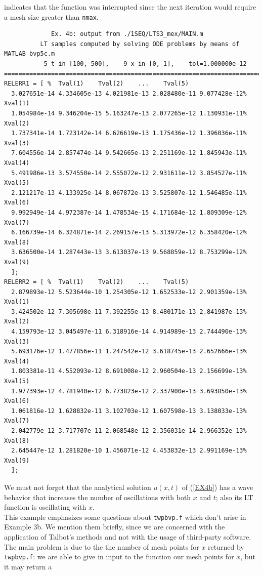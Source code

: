 \documentclass[a4paper,10pt]{report}%
\begin{document}
indicates that the function was interrupted since the next iteration would require a mesh size greater
than {\tt nmax}.
\begin{lstlisting}
             Ex. 4b: output from ./1SEQ/LTS3_mex/MAIN.m
          LT samples computed by solving ODE problems by means of MATLAB bvp5c.m
           5 t in [100, 500],    9 x in [0, 1],    tol=1.000000e-12
====================================================================================
RELERR1 = [ %  Tval(1)    Tval(2)    ...    Tval(5)
  3.027651e-14 4.334605e-13 4.021981e-13 2.028480e-11 9.077428e-12% Xval(1)
  1.054984e-14 9.346204e-15 5.163247e-13 2.077265e-12 1.130931e-11% Xval(2)
  1.737341e-14 1.723142e-14 6.626619e-13 1.175436e-12 1.396036e-11% Xval(3)
  7.604556e-14 2.857474e-14 9.542665e-13 2.251169e-12 1.845943e-11% Xval(4)
  5.491986e-13 3.574550e-14 2.555072e-12 2.931611e-12 3.854527e-11% Xval(5)
  2.121217e-13 4.133925e-14 8.067872e-13 3.525807e-12 1.546485e-11% Xval(6)
  9.992949e-14 4.972387e-14 1.478534e-15 4.171684e-12 1.809309e-12% Xval(7)
  6.166739e-14 6.324871e-14 2.269157e-13 5.313972e-12 6.358420e-12% Xval(8)
  3.636500e-14 1.287443e-13 3.613037e-13 9.568859e-12 8.753299e-12% Xval(9)
  ];
RELERR2 = [ %  Tval(1)    Tval(2)    ...    Tval(5)
  2.879893e-12 5.523644e-10 1.254305e-12 1.652533e-12 2.901359e-13% Xval(1)
  3.424502e-12 7.305698e-11 7.392255e-13 8.480171e-13 2.841987e-13% Xval(2)
  4.159793e-12 3.045497e-11 6.318916e-14 4.914989e-13 2.744490e-13% Xval(3)
  5.693176e-12 1.477856e-11 1.247542e-12 3.618745e-13 2.652666e-13% Xval(4)
  1.803381e-11 4.552093e-12 8.691008e-12 2.960504e-13 2.156699e-13% Xval(5)
  1.977393e-12 4.781940e-12 6.773823e-12 2.337900e-13 3.693850e-13% Xval(6)
  1.061816e-12 1.628832e-11 3.102703e-12 1.607598e-13 3.138033e-13% Xval(7)
  2.042779e-12 3.717707e-11 2.068548e-12 2.356031e-14 2.966352e-13% Xval(8)
  2.645447e-12 1.281820e-10 1.456071e-12 4.453832e-13 2.991169e-13% Xval(9)
  ];
\end{lstlisting}
We must not forget that the analytical solution $u(x,t)$ of (\ref{EX4b}) has a wave behavior that increases the number of oscillations with both $x$ and $t$; also its LT function is oscillating with $x$.
\\[.1in]
\indent This example emphasizes some questions about {\tt twpbvp.f} which don't arise in Example 3b.
We mention them briefly, since we are concerned with the application of Talbot's methods and not with the usage
of third-party software. The main problem is due to the the number of mesh points for $x$ returned by
{\tt twpbvp.f}: we are able to give in input to the function our mesh points for $x$, but it may return a
\end{document}
